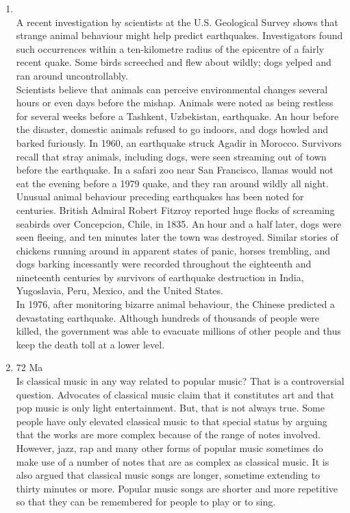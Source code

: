 \documentclass[12pt]{article}
\begin{document}
\begin{enumerate}
    \item {}\\
      A recent investigation by scientists at the U.S. Geological Survey shows that strange animal behaviour might help predict earthquakes. Investigators found such occurrences within a ten-kilometre radius of the epicentre of a fairly recent quake. Some birds screeched and flew about wildly; dogs yelped and ran around uncontrollably.\\

      Scientists believe that animals can perceive environmental changes several hours or even days before the mishap. Animals were noted as being restless for several weeks before a Tashkent, Uzbekistan, earthquake. An hour before the disaster, domestic animals refused to go indoors, and dogs howled and barked furiously. In 1960, an earthquake struck Agadir in Morocco. Survivors recall that stray animals, including dogs, were seen streaming out of town before the earthquake. In a safari zoo near San Francisco, llamas would not eat the evening before a 1979 quake, and they ran around wildly all night.\\

      Unusual animal behaviour preceding earthquakes has been noted for centuries. British Admiral Robert Fitzroy reported huge flocks of screaming seabirds over Concepcion, Chile, in 1835. An hour and a half later, dogs were seen fleeing, and ten minutes later the town was destroyed. Similar stories of chickens running around in apparent states of panic, horses trembling, and dogs barking incessantly were recorded throughout the eighteenth and nineteenth centuries by survivors of earthquake destruction in India, Yugoslavia, Peru, Mexico, and the United States.\\

      In 1976, after monitoring bizarre animal behaviour, the Chinese predicted a devastating earthquake. Although hundreds of thousands of people were killed, the government was able to evacuate millions of other people and thus keep the death toll at a lower level.

    \item 72 Ma\\
      Is classical music in any way related to popular music? That is a controversial question. Advocates of classical music claim that it constitutes art and that pop music is only light entertainment. But, that is not always true. Some people have only elevated classical music to that special status by arguing that the works are more complex because of the range of notes involved. However, jazz, rap and many other forms of popular music sometimes do make use of a number of notes that are as complex as classical music. It is also argued that classical music songs are longer, sometime extending to thirty minutes or more. Popular music songs are shorter and more repetitive so that they can be remembered for people to play or to sing.\\


\end{enumerate}
\end{document}

